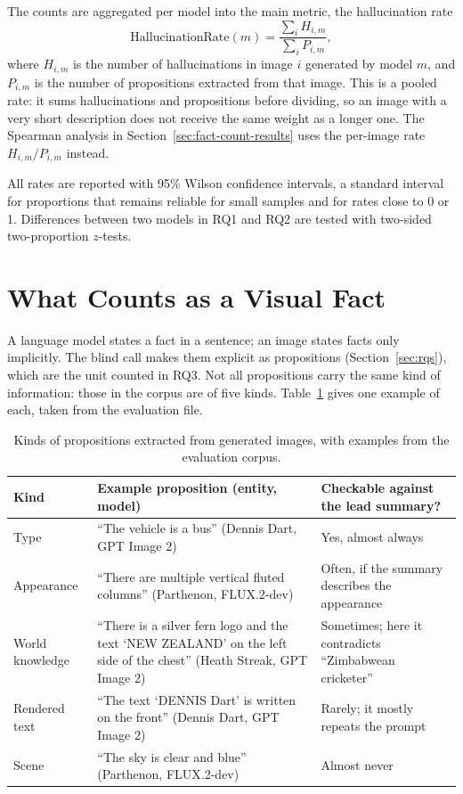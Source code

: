 The counts are aggregated per model into the main metric, the hallucination
rate
\begin{equation}
\mathrm{HallucinationRate}(m) =
\frac{\sum_i H_{i,m}}{\sum_i P_{i,m}},
\end{equation}
where $H_{i,m}$ is the number of hallucinations in image $i$ generated by model
$m$, and $P_{i,m}$ is the number of propositions extracted from that image.
This is a pooled rate: it sums hallucinations and propositions before dividing,
so an image with a very short description does not receive the same weight as
a longer one. The Spearman analysis in Section~\ref{sec:fact-count-results}
uses the per-image rate $H_{i,m}/P_{i,m}$ instead.

All rates are reported with 95\% Wilson confidence intervals, a standard
interval for proportions that remains reliable for small samples and for rates
close to 0 or 1. Differences between two models in RQ1 and RQ2 are tested with
two-sided two-proportion $z$-tests.


\section{What Counts as a Visual Fact}
\label{sec:visual-facts}

A language model states a fact in a sentence; an image states facts only
implicitly. The blind call makes them explicit as propositions
(Section~\ref{sec:rqs}), which are the unit counted in RQ3. Not all propositions
carry the same kind of information: those in the corpus are of five kinds.
Table~\ref{tab:fact-types} gives one example of each, taken from the
evaluation file.


\begin{table}[ht]
\centering
\footnotesize
\caption{Kinds of propositions extracted from generated images, with examples
from the evaluation corpus.}
\label{tab:fact-types}
\begin{tabular}{>{\raggedright\arraybackslash}p{2.1cm}>{\raggedright\arraybackslash}p{6.6cm}>{\raggedright\arraybackslash}p{4.3cm}}
\toprule
Kind & Example proposition (entity, model) & Checkable against the lead summary? \\
\midrule
Type & ``The vehicle is a bus'' (Dennis Dart, GPT Image 2) & Yes, almost always \\
Appearance & ``There are multiple vertical fluted columns'' (Parthenon, FLUX.2-dev) & Often, if the summary describes the appearance \\
World knowledge & ``There is a silver fern logo and the text `NEW ZEALAND' on the left side of the chest'' (Heath Streak, GPT Image 2) & Sometimes; here it contradicts ``Zimbabwean cricketer'' \\
Rendered text & ``The text `DENNIS Dart' is written on the front'' (Dennis Dart, GPT Image 2) & Rarely; it mostly repeats the prompt \\
Scene & ``The sky is clear and blue'' (Parthenon, FLUX.2-dev) & Almost never \\
\bottomrule
\end{tabular}
\end{table}

